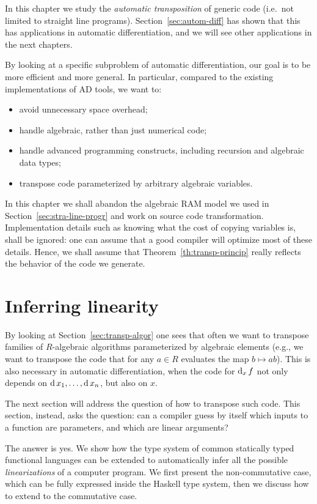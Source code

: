 In this chapter we study the
\emph{automatic transposition} of
generic code (i.e.\ not limited to straight line
programs). Section~\ref{sec:autom-diff} has shown that this has
applications in automatic differentiation, and we will see other
applications in the next chapters.

By looking at a specific subproblem of automatic differentiation, our
goal is to be more efficient and more general. In particular, compared
to the existing implementations of AD tools, we want to:
\begin{itemize}
\item avoid unnecessary space overhead;
\item handle algebraic, rather than just numerical code;
\item handle advanced programming constructs, including recursion and
  algebraic data types;
\item transpose code parameterized by arbitrary algebraic variables.
\end{itemize}

In this chapter we shall abandon the algebraic RAM model we used in
Section~\ref{sec:stra-line-progr} and work on source code
transformation. Implementation details such as knowing what the cost
of copying variables is, shall be ignored: one can assume that a good
compiler will optimize most of these details. Hence, we shall assume
that Theorem~\ref{th:transp-princip} really reflects the behavior of
the code we generate.


\section{Inferring linearity}
\label{sec:inference}
\lstset{language=haskell}

By looking at Section~\ref{sec:transp-algor} one sees that often we
want to transpose families of $R$-algebraic algorithms parameterized
by algebraic elements (e.g., we want to transpose the code that for
any $a\in R$ evaluates the map $b\mapsto ab$). This is also necessary
in automatic differentiation, when the code for $\operatorname{d}_x f$ not only
depends on $\operatorname{d} x_1,\ldots,\operatorname{d} x_n$, but also on $x$.

The next section will address the question of how to transpose such
code. This section, instead, asks the question: can a compiler guess
by itself which inputs to a function are parameters, and which are
linear arguments?

The answer is yes. We show how the type system of common statically
typed functional languages can be extended to automatically infer all
the possible \emph{linearizations} of a computer
program. We first present the non-commutative case, which can be fully
expressed inside the Haskell type system, then we discuss how to
extend to the commutative case.

